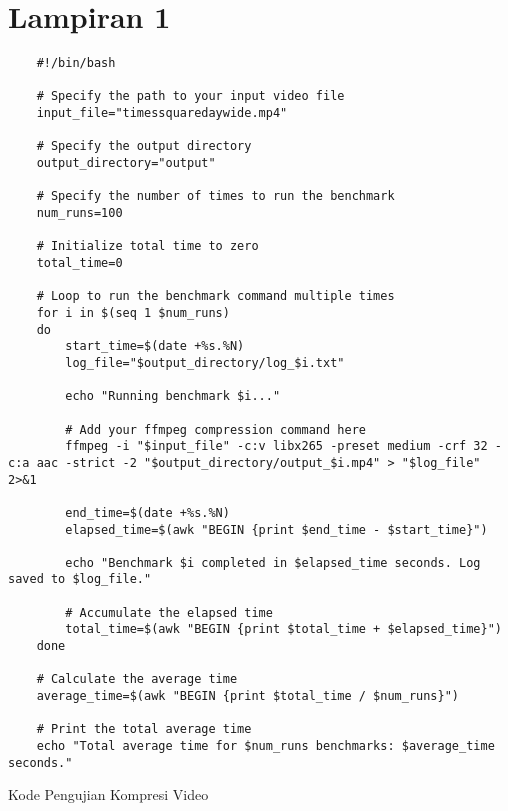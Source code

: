 \chapter*{Lampiran 1}

\begin{listing}[H]
    \begin{verbatim}
    #!/bin/bash

    # Specify the path to your input video file
    input_file="timessquaredaywide.mp4"

    # Specify the output directory
    output_directory="output"

    # Specify the number of times to run the benchmark
    num_runs=100

    # Initialize total time to zero
    total_time=0

    # Loop to run the benchmark command multiple times
    for i in $(seq 1 $num_runs)
    do
        start_time=$(date +%s.%N)
        log_file="$output_directory/log_$i.txt"
        
        echo "Running benchmark $i..."
        
        # Add your ffmpeg compression command here
        ffmpeg -i "$input_file" -c:v libx265 -preset medium -crf 32 -c:a aac -strict -2 "$output_directory/output_$i.mp4" > "$log_file" 2>&1
        
        end_time=$(date +%s.%N)
        elapsed_time=$(awk "BEGIN {print $end_time - $start_time}")
        
        echo "Benchmark $i completed in $elapsed_time seconds. Log saved to $log_file."
        
        # Accumulate the elapsed time
        total_time=$(awk "BEGIN {print $total_time + $elapsed_time}")
    done

    # Calculate the average time
    average_time=$(awk "BEGIN {print $total_time / $num_runs}")

    # Print the total average time
    echo "Total average time for $num_runs benchmarks: $average_time seconds."
    \end{verbatim}
    \caption{Kode Pengujian Kompresi Video}
    \label{code:kode_pengujian_kompresi_video}
\end{listing}

